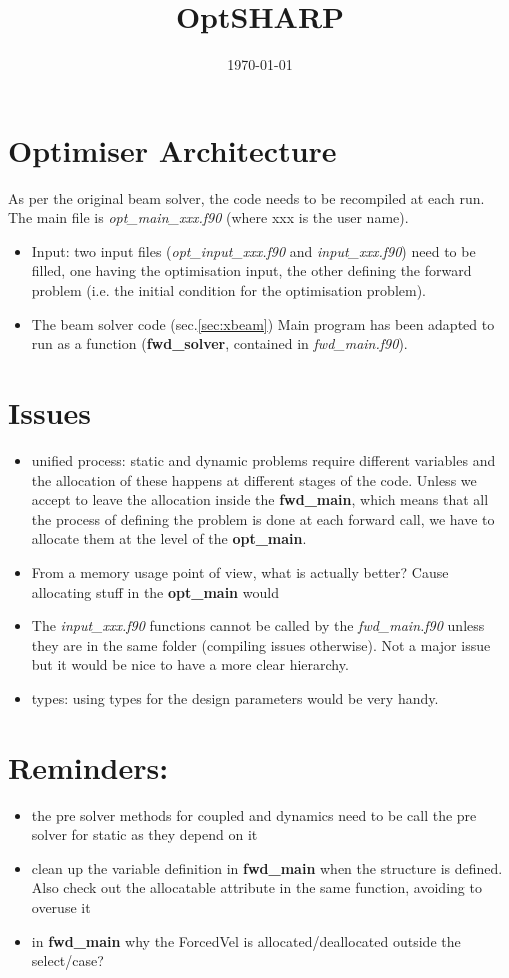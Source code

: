 \documentclass[a4paper,10pt]{article}
\title{OptSHARP}
\date{\today}
\newcommand{\bit}{\begin{itemize}}
\newcommand{\eit}{\end{itemize}}
\newcommand{\ffile}[1]{\textsl{{#1}.f90}} %
\newcommand{\ffun}[1]{\textbf{{#1}}}  %
\begin{document}
\maketitle



\section{Optimiser Architecture}
As per the original beam solver, the code needs to be recompiled at each run. The main file is \ffile{opt\_main\_xxx} (where xxx is the user name).
\bit
\item Input: two input files (\ffile{opt\_input\_xxx} and \ffile{input\_xxx}) need to be filled, one having the optimisation input, the other defining the forward problem (i.e. the initial condition for the optimisation problem).

\item The beam solver code (sec.\ref{sec:xbeam}) Main program has been adapted to run as a function (\ffun{fwd\_solver}, contained in \ffile{fwd\_main}). 


\eit



\section{Issues}
\bit
\item unified process: static and dynamic problems require different variables and the allocation of these happens at different stages of the code. Unless we accept to leave the allocation inside the \ffun{fwd\_main}, which means that all the process of defining the problem is done at each forward call, we have to allocate them at the level of the \ffun{opt\_main}.
\item From a memory usage point of view, what is actually better? Cause allocating stuff in the \ffun{opt\_main} would 
\item The \ffile{input\_xxx} functions cannot be called by the \ffile{fwd\_main} unless they are in the same folder (compiling issues otherwise). Not a major issue but it would be nice to have a more clear hierarchy.
\item types: using types for the design parameters would be very handy.
\eit


\section{Reminders:}
\bit
\item the pre solver methods for coupled and dynamics need to be call the pre solver for static as they depend on it
\item clean up the variable definition in \ffun{fwd\_main} when the structure is defined. Also check out the allocatable attribute in the same function, avoiding to overuse it
\item in \ffun{fwd\_main} why the ForcedVel is allocated/deallocated outside the select/case?
\eit
\end{document}
